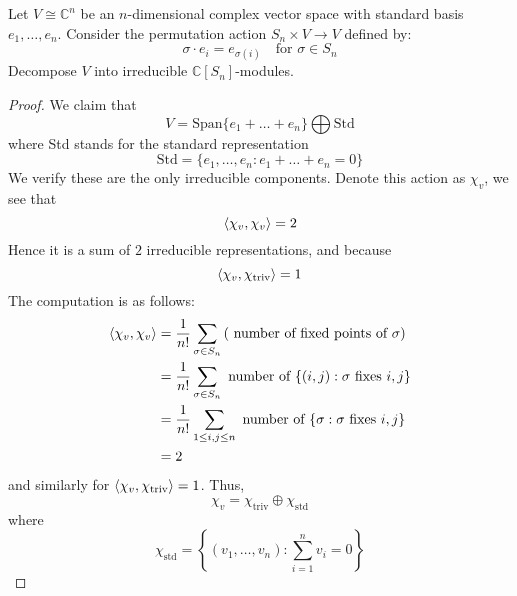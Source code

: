 \begin{prob}[S2008-Q4]
    Let \( V \cong \mathbb{C}^n \) be an \( n \)-dimensional complex vector space with standard basis \( e_1, \ldots, e_n \). Consider the permutation action \( S_n \times V \to V \) defined by:
    \[
    \sigma \cdot e_i = e_{\sigma(i)} \quad \text{for } \sigma \in S_n
    \]
    Decompose \( V \) into irreducible \( \mathbb{C}[S_n] \)-modules.
\end{prob}
\begin{proof}
    We claim that 
    \begin{equation*}
        V=\text{Span}\{e_1+\dots+e_n\}\bigoplus\text{Std}
    \end{equation*}
    where Std stands for the standard representation 
    \begin{equation*}
        \text{Std}=\{e_1,\dots, e_n: e_1+\dots+e_n=0\}
    \end{equation*}
    We verify these are the only irreducible components. Denote this action as $\chi_v$, we see that
    \begin{equation*}
        \langle\chi_v,\chi_v\rangle=2
    \end{equation*}
    Hence it is a sum of $2$ irreducible representations, and because 
    \begin{equation*}
        \langle\chi_v,\chi_{\text{triv}}\rangle=1
    \end{equation*}
    The computation is as follows: 
    \begin{align*}
        \langle\chi_v,\chi_v\rangle&=\frac{1}{n!}\sum_{\sigma\in S_n}\left(\text{ number of fixed points of $\sigma$}\right)\\
        &=\frac{1}{n!}\sum_{\sigma\in S_n}\text{ number of }\{(i,j): \sigma \text{ fixes } i, j\}\\
        &=\frac{1}{n!}\sum_{1\leq i,j\leq n}\text{ number of }\{\sigma: \sigma \text{ fixes } i,j\}\\
        &=2
    \end{align*}
    and similarly for $\langle\chi_v,\chi_{\text{triv}}\rangle=1$. Thus,
    \begin{equation*}
        \chi_v=\chi_{\text{triv}}\oplus\chi_{\text{std}}
    \end{equation*}
    where 
    \begin{equation*}
        \chi_{\text{std}}=\left\{(v_1,\dots,v_n): \sum_{i=1}^nv_i=0\right\}
    \end{equation*}
\end{proof}









